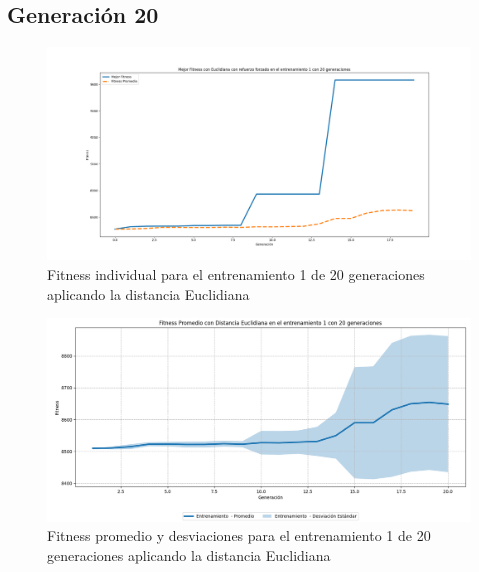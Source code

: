 \documentclass[conference]{IEEEtran}
\begin{document}
\subsection{Generación 20}
\setcounter{figure}{0}
\renewcommand{\thefigure}{S\arabic{figure}C-E}
\begin{figure}[H]
    \centering
    \includegraphics[width=0.9 \linewidth]{Euclidiana/Fitness_individual_20/Fitness_1_Eucli_20Gen.png}
    \caption{Fitness individual para el entrenamiento 1 de 20 generaciones aplicando la distancia Euclidiana}
    \label{fig:eucli_1_20}
\end{figure}
\begin{figure}[H]
    \centering
    \includegraphics[width=0.9 \linewidth]{Euclidiana/Fitness_individual_20/Fitness_1_Eucli_20Gen_Sombra.png}
    \caption{Fitness promedio y desviaciones para el entrenamiento 1 de 20 generaciones aplicando la distancia Euclidiana}
    \label{fig:eucli_1_20_sombra}
\end{figure}
\end{document}
